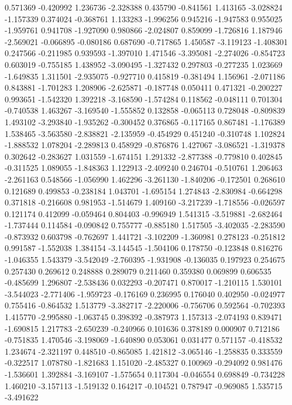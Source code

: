 0.571369
-0.420992
1.236736
-2.328388
0.435790
-0.841561
1.413165
-3.028824
-1.157339
0.374024
-0.368761
1.133283
-1.996256
0.945216
-1.947583
0.955025
-1.959761
0.941708
-1.927090
0.980866
-2.024807
0.859099
-1.726816
1.187946
-2.569021
-0.066895
-0.080186
0.687690
-0.717865
1.450587
-3.119123
-1.408301
0.247566
-0.211985
0.939593
-1.397010
1.471546
-3.395081
-2.274026
-0.854723
0.603019
-0.755185
1.438952
-3.090495
-1.327432
0.297803
-0.277235
1.023669
-1.649835
1.311501
-2.935075
-0.927710
0.415819
-0.381494
1.156961
-2.071186
0.843881
-1.701283
1.208906
-2.625871
-0.187748
0.050411
0.471321
-0.200227
0.993651
-1.542320
1.392218
-3.168590
-1.574284
0.118562
-0.048111
0.701304
-0.740538
1.463267
-3.169540
-1.555852
0.132858
-0.065113
0.728048
-0.809839
1.493102
-3.293840
-1.935262
-0.300452
0.376865
-0.117165
0.867481
-1.176389
1.538465
-3.563580
-2.838821
-2.135959
-0.454929
0.451240
-0.310748
1.102824
-1.888532
1.078204
-2.289813
0.458929
-0.876876
1.427067
-3.086521
-1.319378
0.302642
-0.283627
1.031559
-1.674151
1.291332
-2.877388
-0.779810
0.402845
-0.311525
1.089055
-1.848363
1.122913
-2.409240
0.246704
-0.510761
1.206463
-2.261163
0.548566
-1.056990
1.462296
-3.261130
-1.840206
-0.172501
0.268610
0.121689
0.499853
-0.238184
1.043701
-1.695154
1.274843
-2.830984
-0.664298
0.371818
-0.216608
0.981953
-1.514679
1.409160
-3.217239
-1.718556
-0.026597
0.121174
0.412099
-0.059464
0.804403
-0.996949
1.541315
-3.519881
-2.682464
-1.737444
0.114584
-0.090842
0.755777
-0.885180
1.517505
-3.402035
-2.283590
-0.873932
0.603798
-0.762697
1.441721
-3.102209
-1.360981
0.278123
-0.251812
0.991587
-1.552038
1.384154
-3.144545
-1.504106
0.178750
-0.123848
0.816276
-1.046355
1.543379
-3.542049
-2.760395
-1.931908
-0.136035
0.197923
0.254675
0.257430
0.269612
0.248888
0.289079
0.211460
0.359380
0.069899
0.606535
-0.485699
1.296807
-2.538436
0.032293
-0.207471
0.870017
-1.210115
1.530101
-3.544023
-2.771406
-1.959723
-0.176169
0.236995
0.176040
0.402950
-0.024977
0.755416
-0.864532
1.513779
-3.382717
-2.220006
-0.756706
0.592564
-0.702393
1.415770
-2.995880
-1.063745
0.398392
-0.387973
1.157313
-2.074193
0.839471
-1.690815
1.217783
-2.650239
-0.240966
0.101636
0.378189
0.000907
0.712186
-0.751835
1.470546
-3.198069
-1.640890
0.053061
0.031477
0.571157
-0.418532
1.234674
-2.321197
0.448510
-0.865085
1.421812
-3.065146
-1.258835
0.333559
-0.322517
1.078780
-1.821683
1.151020
-2.485327
0.100969
-0.294092
0.981476
-1.536601
1.392884
-3.169107
-1.575654
0.117304
-0.046554
0.698849
-0.734228
1.460210
-3.157113
-1.519132
0.164217
-0.104521
0.787947
-0.969085
1.535715
-3.491622
